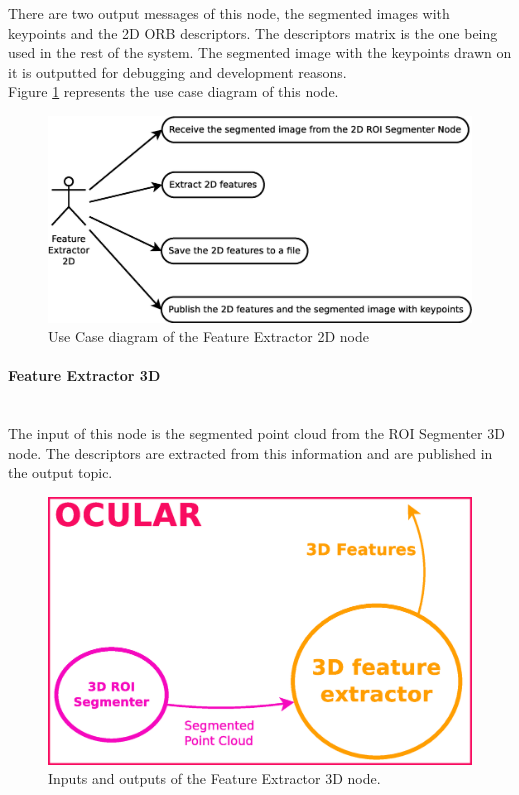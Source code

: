 	There are two output messages of this node, the segmented images with keypoints and the 2D ORB descriptors. 
	The descriptors matrix is the one being used in the rest of the system. 
	The segmented image with the keypoints drawn on it is outputted for debugging and development reasons. 
	\\

	Figure  \ref{uc_fe2d} represents the use case diagram of this node. 
	\begin{figure}[H]
		\centering
			\includegraphics[scale=0.4]{img/diagrams/uc_feature_extractor_2d.eps}
			\caption[Use case diagram Feature Extractor 2D node]{Use Case diagram of the Feature Extractor 2D node}
		\label{uc_fe2d}
	\end{figure}

\newpage

\paragraph{Feature Extractor 3D}\mbox{}\\

	The input of this node is the segmented point cloud from the ROI Segmenter 3D node. The descriptors are extracted from this information and are published in the output topic. 
	\\
		\begin{figure}[H]
			\begin{center}
			\includegraphics[width=0.5\linewidth]{img/diagrams/node_fe3d.eps}
			\caption[Feature Extractor 3D node I/O]{Inputs and outputs of the Feature Extractor 3D node.}		
			\label{node_fe3d}
			\end{center}
		\end{figure}

